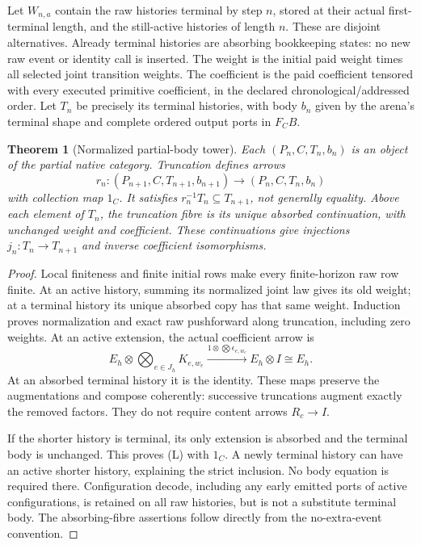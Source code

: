 \documentclass{article}
\newtheorem{theorem}{Theorem}\newtheorem{proposition}[theorem]{Proposition}
\begin{document}
Let $W_{n,a}$ contain the raw histories terminal by step $n$, stored at their
actual first-terminal length, and the still-active histories of length $n$.
These are disjoint alternatives. Already terminal histories are absorbing
bookkeeping states: no new raw event or identity call is inserted. The
weight is the initial paid weight times all selected joint transition weights.
The coefficient is the paid coefficient tensored with every executed primitive
coefficient, in the declared chronological/addressed order. Let $T_n$ be
precisely its terminal histories, with body $b_n$ given by the arena's
terminal shape and complete ordered output ports in $F_CB$.

\begin{theorem}[Normalized partial-body tower]
Each $(P_n,C,T_n,b_n)$ is an object of the partial native category. Truncation
defines arrows
\[
 r_n:(P_{n+1},C,T_{n+1},b_{n+1})\longrightarrow(P_n,C,T_n,b_n)
\]
with collection map $1_C$. It satisfies
$r_n^{-1}T_n\subseteq T_{n+1}$, not generally equality. Above each element
of $T_n$, the truncation fibre is its unique absorbed continuation, with
unchanged weight and coefficient. These continuations give injections
$j_n:T_n\to T_{n+1}$ and inverse coefficient isomorphisms.
\end{theorem}
\begin{proof}
Local finiteness and finite initial rows make every finite-horizon raw row
finite. At an active history, summing its normalized joint law gives its
old weight; at a terminal history its unique absorbed copy has that same
weight. Induction proves normalization and exact raw pushforward along
truncation, including zero weights. At an active extension, the actual
coefficient arrow is
\[
 E_h\otimes\bigotimes_{e\in J_h}K_{e,w_e}
 \xrightarrow{1\otimes\bigotimes\epsilon_{e,w_e}} E_h\otimes I
 \cong E_h.
\]
At an absorbed terminal history it is the identity. These maps preserve the
augmentations and compose coherently: successive truncations augment exactly
the removed factors. They do not require content arrows $R_c\to I$.

If the shorter history is terminal, its only extension is absorbed and the
terminal body is unchanged. This proves (L) with $1_C$. A newly terminal
history can have an active shorter history, explaining the strict inclusion.
No body equation is required there. Configuration decode, including any early
emitted ports of active configurations, is retained on all raw histories,
but is not a substitute terminal body. The absorbing-fibre assertions follow
directly from the no-extra-event convention.
\end{proof}
\end{document}
